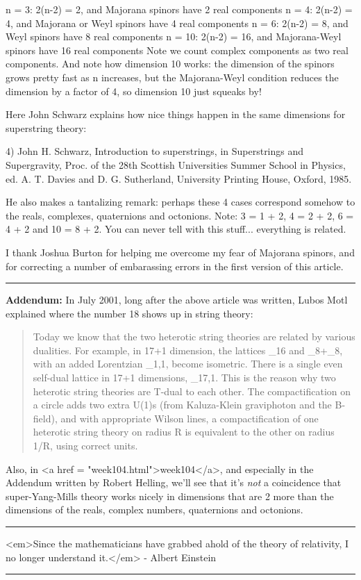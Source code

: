 n = 3:    2(n-2) = 2, and Majorana spinors have 2 real components
n = 4:  2(n-2) = 4, and Majorana or Weyl spinors have 4 real components
n = 6:  2(n-2) = 8, and Weyl spinors have 8 real components
n = 10:  2(n-2) = 16, and Majorana-Weyl spinors have 16 real components
Note we count complex components as two real components.  And note how
dimension 10 works: the dimension of the spinors grows pretty fast as
n increases, but the Majorana-Weyl condition reduces the dimension by
a factor of 4, so dimension 10 just squeaks by!

Here John Schwarz explains how nice things happen in the same dimensions
for superstring theory: 

4) John H. Schwarz, Introduction to superstrings, in Superstrings
and Supergravity, Proc. of the 28th Scottish Universities Summer
School in Physics, ed. A. T. Davies and D. G. Sutherland, University
Printing House, Oxford, 1985.

He also makes a tantalizing remark: perhaps these 4 cases correspond
somehow to the reals, complexes, quaternions and octonions.  Note:
3 = 1 + 2, 4 = 2 + 2, 6 = 4 + 2 and 10 = 8 + 2.  You can never tell
with this stuff... everything is related.

I thank Joshua Burton for helping me overcome my fear of Majorana
spinors, and for correcting a number of embarassing errors in the
first version of this article.

\par\noindent\rule{\textwidth}{0.4pt}
\textbf{Addendum:} In July 2001, long after the above article was written,
Lubos Motl explained where the number 18 shows up in string theory:


\begin{quote}
Today we know that the two heterotic string theories are related by
various dualities. For example, in 17+1 dimension, the lattices 
\Gamma _{16} and \Gamma _{8}+\Gamma _{8}, 
with an added Lorentzian \Gamma _{1,1}, become
isometric. There is a single even self-dual lattice in 17+1 dimensions,
\Gamma _{17,1}. This is the reason why two heterotic string theories 
are T-dual to each other. The compactification on a circle adds two extra
U(1)s (from Kaluza-Klein graviphoton and the B-field), and with
appropriate Wilson lines, a compactification of one heterotic string
theory on radius R is equivalent to the other on radius 1/R, using 
correct units.
\end{quote}


Also, in <a href = "week104.html">week104</a>, and especially in the 
Addendum written by Robert Helling, we'll see that it's \emph{not}
a coincidence that super-Yang-Mills theory works nicely in dimensions 
that are 2 more than the dimensions of the reals, complex numbers,
quaternions and octonions.  

\par\noindent\rule{\textwidth}{0.4pt}
<em>Since the mathematicians have grabbed ahold of the theory of relativity,
I no longer understand it.</em> - Albert Einstein


\par\noindent\rule{\textwidth}{0.4pt}

